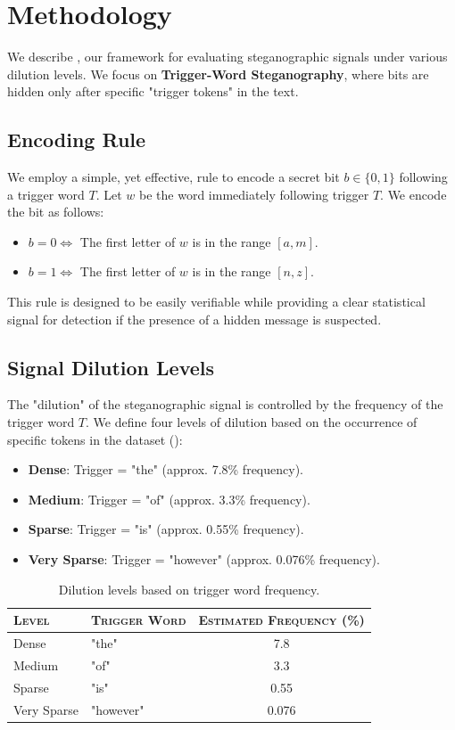 \section{Methodology}
\label{sec:methodology}

We describe \ours, our framework for evaluating steganographic signals under various dilution levels. We focus on {\bf Trigger-Word Steganography}, where bits are hidden only after specific "trigger tokens" in the text.

\subsection{Encoding Rule}
We employ a simple, yet effective, rule to encode a secret bit $b \in \{0, 1\}$ following a trigger word $T$.
Let $w$ be the word immediately following trigger $T$. We encode the bit as follows:
\begin{itemize}[leftmargin=*,itemsep=0pt,topsep=0pt]
    \item $b = 0 \iff$ The first letter of $w$ is in the range $[a, m]$.
    \item $b = 1 \iff$ The first letter of $w$ is in the range $[n, z]$.
\end{itemize}
This rule is designed to be easily verifiable while providing a clear statistical signal for detection if the presence of a hidden message is suspected.

\subsection{Signal Dilution Levels}
The "dilution" of the steganographic signal is controlled by the frequency of the trigger word $T$. We define four levels of dilution based on the occurrence of specific tokens in the \wikitext dataset ():
\begin{itemize}[leftmargin=*,itemsep=0pt,topsep=0pt]
    \item {\bf Dense}: Trigger = "the" (approx. 7.8\% frequency).
    \item {\bf Medium}: Trigger = "of" (approx. 3.3\% frequency).
    \item {\bf Sparse}: Trigger = "is" (approx. 0.55\% frequency).
    \item {\bf Very Sparse}: Trigger = "however" (approx. 0.076\% frequency).
\end{itemize}

\begin{table}[h]
\centering
\caption{Dilution levels based on trigger word frequency.}
\begin{tabular}{@{}llc@{}}
\toprule
\textsc{Level} & \textsc{Trigger Word} & \textsc{Estimated Frequency (\%)} \\
\midrule
Dense & "the" & 7.8 \\
Medium & "of" & 3.3 \\
Sparse & "is" & 0.55 \\
Very Sparse & "however" & 0.076 \\
\bottomrule
\end{tabular}
\label{tab:dilution_levels}
\end{table}

